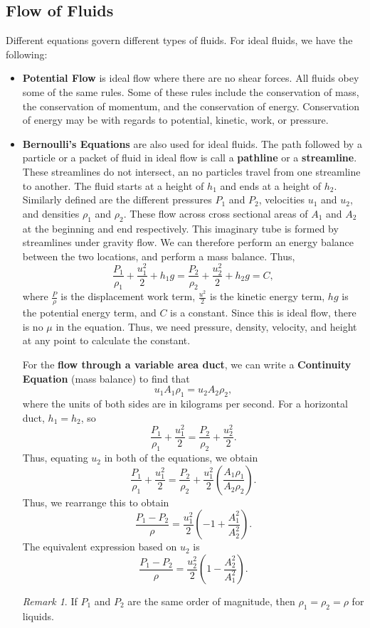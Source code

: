 \documentclass[11pt]{article}
\theoremstyle{plain} %
\theoremstyle{definition}
\theoremstyle{example}
\theoremstyle{remark}
\newtheorem*{remark}{Remark}
\begin{document}
\subsection{Flow of Fluids}
Different equations govern different types of fluids. For ideal fluids, we have the following:
\begin{itemize}
	\item \textbf{Potential Flow} is ideal flow where there are no shear forces. All fluids obey some of the same rules. Some of these rules include the conservation of mass, the conservation of momentum, and the conservation of energy. Conservation of energy may be with regards to potential, kinetic, work, or pressure.
	\item \textbf{Bernoulli's Equations} are also used for ideal fluids. The path followed by a particle or a packet of fluid in ideal flow is call a \textbf{pathline} or a \textbf{streamline}. These streamlines do not intersect, an no particles travel from one streamline to another. The fluid starts at a height of $h_1$ and ends at a height of $h_2$. Similarly defined are the different pressures $P_1$ and $P_2$, velocities $u_1$ and $u_2$, and densities $\rho_1$ and $\rho_2$. These flow across cross sectional areas of $A_1$ and $A_2$ at the beginning and end respectively. This imaginary tube is formed by streamlines under gravity flow. We can therefore perform an energy balance between the two locations, and perform a mass balance. Thus, 
	$$\frac{P_1}{\rho_1} + \frac{u_1^2}{2} + h_1g = \frac{P_2}{\rho_2} + \frac{u_2^2}{2} + h_2g = C,$$ where $\frac{P}{\rho}$ is the displacement work term, $\frac{u^2}{2}$ is the kinetic energy term, $hg$ is the potential energy term, and $C$ is a constant. Since this is ideal flow, there is no $\mu$ in the equation. Thus, we need pressure, density, velocity, and height at any point to calculate the constant. 
	
	For the \textbf{flow through a variable area duct}, we can write a \textbf{Continuity Equation} (mass balance) to find that $$u_1A_1\rho_1 = u_2A_2\rho_2,$$
	where the units of both sides are in kilograms per second. For a horizontal duct, $h_1=h_2$, so 
	$$\frac{P_1}{\rho_1} + \frac{u_1^2}{2} = \frac{P_2}{\rho_2} + \frac{u_2^2}{2} .$$
	Thus, equating $u_2$ in both of the equations, we obtain 
	$$\frac{P_1}{\rho_1} + \frac{u_1^2}{2} = \frac{P_2}{\rho_2}+\frac{u_1^2}{2}\left(\frac{A_1\rho_1}{A_2\rho_2}\right).$$ Thus, we rearrange this to obtain 
	$$\frac{P_1-P_2}{\rho} = \frac{u_1^2}{2}\left(-1+\frac{A_1^2}{A_2^2}\right).$$ The equivalent expression based on $u_2$ is 
	$$\frac{P_1-P_2}{\rho} = \frac{u_2^2}{2}\left(1-\frac{A_2^2}{A_1^2}\right).$$
	\begin{remark}If $P_1$ and $P_2$ are the same order of magnitude, then $\rho_1 = \rho_2 = \rho$ for liquids. 
	\end{remark}
	

\end{itemize}
\end{document}
